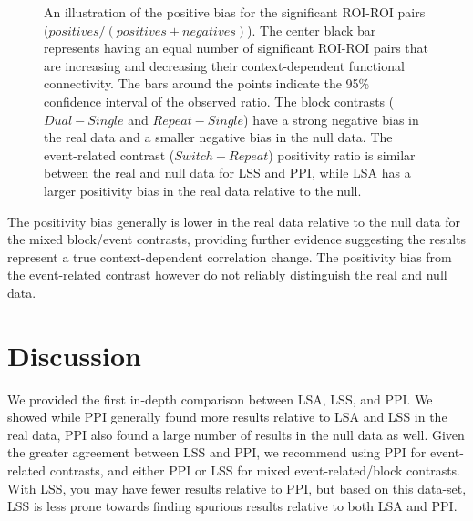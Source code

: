\documentclass[phd,appendix,figures]{uithesis}
\begin{document}
\begin{figure}[H]
  \centering
  \hfill
  \vfill
  \hfill
  \caption[Positive bias of LSA/LSS/PPI using participant data]{
    An illustration of the positive bias for the significant ROI-ROI pairs
    ($positives / (positives + negatives)$).
    The center black bar represents having an equal number of significant
    ROI-ROI pairs that are increasing and decreasing their context-dependent
    functional connectivity.
    The bars around the points indicate the 95\% confidence interval
    of the observed ratio.
    The block contrasts ($Dual - Single$ and $Repeat - Single$) have a strong negative
    bias in the real data and a smaller negative bias in the null data.
    The event-related contrast ($Switch - Repeat$) positivity ratio is
    similar between the real and null data for LSS and PPI, while LSA
    has a larger positivity bias in the real data relative to the null.
  }
\label{fig:positive_bias}
\end{figure}

The positivity bias generally is lower in the real data relative
to the null data for the mixed block/event contrasts,
providing further evidence suggesting the results represent a true context-dependent
correlation change.
The positivity bias from the event-related contrast however do not reliably distinguish the real
and null data.

\section{Discussion}
We provided the first in-depth comparison between LSA, LSS, and PPI.
We showed while PPI generally found more results relative to LSA and LSS in the real data,
PPI also found a large number of results in the null data as well.
Given the greater agreement between LSS and PPI, we recommend using PPI
for event-related contrasts, and either PPI or LSS for mixed event-related/block contrasts.
With LSS, you may have fewer results relative to PPI, but based on this data-set,
LSS is less prone towards finding spurious results relative to both LSA and PPI.
\end{document}
